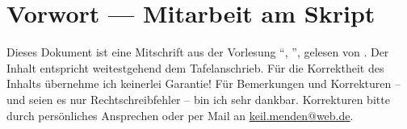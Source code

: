 \section*{Vorwort --- Mitarbeit am Skript}
Dieses Dokument ist eine Mitschrift aus der Vorlesung \enquote{\fach, \Semester}, gelesen von \prof. Der Inhalt entspricht weitestgehend dem Tafelanschrieb. Für die
Korrektheit des Inhalts übernehme ich keinerlei Garantie! Für Bemerkungen und Korrekturen -- und seien es nur Rechtschreibfehler -- bin ich sehr dankbar. 
Korrekturen bitte durch persönliches Ansprechen oder per Mail an \url{keil.menden@web.de}.
	
	

